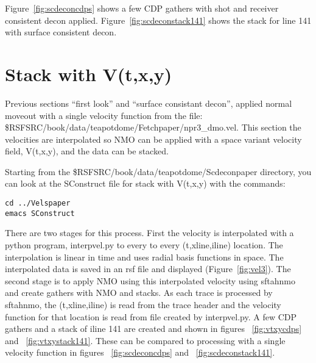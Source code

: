 Figure~\ref{fig:scdeconcdps} shows a few CDP gathers with shot and receiver consistent decon applied.  Figure~\ref{fig:scdeconstack141} shows the stack for line 141 with surface consistent decon.



\section{Stack with V(t,x,y)}

Previous sections ``first look'' and  ``surface consistant decon'', applied normal moveout  with a single velocity function from the file:
\$RSFSRC/book/data/teapotdome/Fetchpaper/npr3\_dmo.vel.
This section the velocities are interpolated so NMO can be applied with a space variant velocity field, V(t,x,y), and the data can be stacked.

Starting from the \$RSFSRC/book/data/teapotdome/Scdeconpaper directory, you can look at the SConstruct file for stack with V(t,x,y) with the commands:
\begin{verbatim}  
cd ../Velspaper
emacs SConstruct
\end{verbatim}  

There are two stages for this process.  First the velocity is interpolated with a python program, interpvel.py to every to every (t,xline,iline) location.  The interpolation is linear in time and uses radial basis functions in space.  The interpolated data is saved in an rsf file and displayed (Figure~\ref{fig:vel3}). The second stage is to apply NMO using this interpolated velocity using sftahnmo and create gathers with NMO and stacks.  As each trace is processed by sftahnmo, the (t,xline,iline) is read from the trace header and the velocity function for that location is read from file created by interpvel.py.  A few CDP gathers and a stack of iline 141 are created and shown in figures ~\ref{fig:vtxycdps} and ~\ref{fig:vtxystack141}.  These can be compared to processing with a single velocity function in figures ~\ref{fig:scdeconcdps} and ~\ref{fig:scdeconstack141}.


